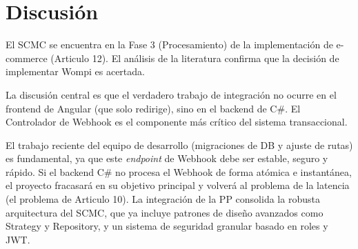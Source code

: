 \section{Discusión}
El SCMC se encuentra en la Fase 3 (Procesamiento) de la implementación de e-commerce (Articulo 12). El análisis de la literatura confirma que la decisión de implementar Wompi es acertada.

La discusión central es que el verdadero trabajo de integración no ocurre en el frontend de Angular (que solo redirige), sino en el backend de C\#. El Controlador de Webhook es el componente más crítico del sistema transaccional.

El trabajo reciente del equipo de desarrollo (migraciones de DB y ajuste de rutas) es fundamental, ya que este \textit{endpoint} de Webhook debe ser estable, seguro y rápido. Si el backend C\# no procesa el Webhook de forma atómica e instantánea, el proyecto fracasará en su objetivo principal y volverá al problema de la latencia (el problema de Articulo 10). La integración de la PP consolida la robusta arquitectura del SCMC, que ya incluye patrones de diseño avanzados como Strategy y Repository, y un sistema de seguridad granular basado en roles y JWT.